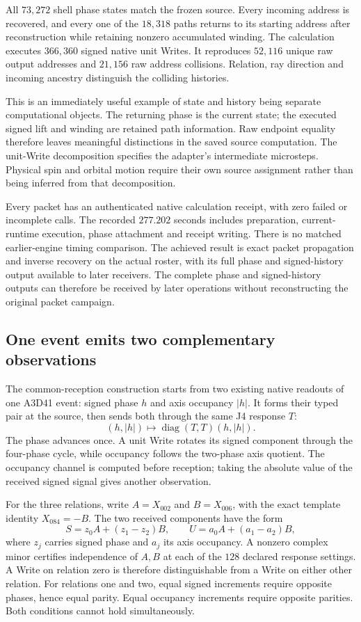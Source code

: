 All $73{,}272$ shell phase states match the frozen source. Every incoming address is recovered, and every one of the $18{,}318$ paths returns to its starting address after reconstruction while retaining nonzero accumulated winding. The calculation executes $366{,}360$ signed native unit Writes. It reproduces $52{,}116$ unique raw output addresses and $21{,}156$ raw address collisions. Relation, ray direction and incoming ancestry distinguish the colliding histories.

This is an immediately useful example of state and history being separate computational objects. The returning phase is the current state; the executed signed lift and winding are retained path information. Raw endpoint equality therefore leaves meaningful distinctions in the saved source computation. The unit-Write decomposition specifies the adapter's intermediate microsteps. Physical spin and orbital motion require their own source assignment rather than being inferred from that decomposition.

Every packet has an authenticated native calculation receipt, with zero failed or incomplete calls. The recorded $277.202$ seconds includes preparation, current-runtime execution, phase attachment and receipt writing. There is no matched earlier-engine timing comparison. The achieved result is exact packet propagation and inverse recovery on the actual roster, with its full phase and signed-history output available to later receivers. The complete phase and signed-history outputs can therefore be received by later operations without reconstructing the original packet campaign.

\subsection{One event emits two complementary observations}

The common-reception construction starts from two existing native readouts of one A3D41 event: signed phase $h$ and axis occupancy $|h|$. It forms their typed pair at the source, then sends both through the same J4 response $T$:
\[
 (h,|h|)\longmapsto\operatorname{diag}(T,T)(h,|h|).
\]
The phase advances once. A unit Write rotates its signed component through the four-phase cycle, while occupancy follows the two-phase axis quotient. The occupancy channel is computed before reception; taking the absolute value of the received signed signal gives another observation. 

For the three relations, write $A=X_{002}$ and $B=X_{006}$, with the exact template identity $X_{084}=-B$. The two received components have the form
\[
 S=z_0A+(z_1-z_2)B,
 \qquad U=a_0A+(a_1-a_2)B,
\]
where $z_j$ carries signed phase and $a_j$ its axis occupancy. A nonzero complex minor certifies independence of $A,B$ at each of the $128$ declared response settings. A Write on relation zero is therefore distinguishable from a Write on either other relation. For relations one and two, equal signed increments require opposite phases, hence equal parity. Equal occupancy increments require opposite parities. Both conditions cannot hold simultaneously. 

